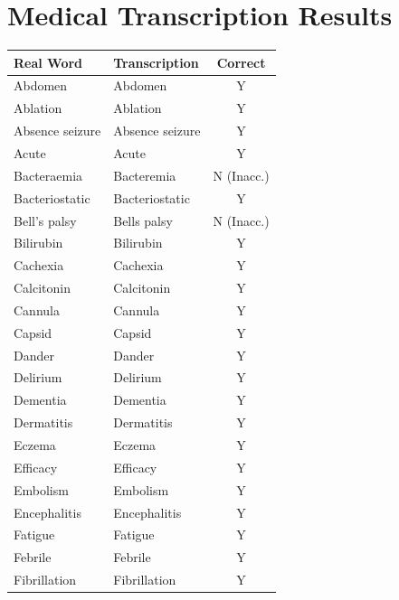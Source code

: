 \chapter{Medical Transcription Results}
\label{app:testing_transcription_results}

\begin{table}[H] %
\centering
\footnotesize %
\renewcommand{\arraystretch}{0.8} %

\begin{minipage}[t]{0.48\textwidth}
\centering
\begin{tabular}{|l|l|c|}
\hline
\textbf{Real Word} & \textbf{Transcription} & \textbf{Correct} \\ \hline
Abdomen & Abdomen & Y \\ \hline
Ablation & Ablation & Y \\ \hline
Absence seizure & Absence seizure & Y \\ \hline
Acute & Acute & Y \\ \hline
Bacteraemia & Bacteremia & N (Inacc.) \\ \hline
Bacteriostatic & Bacteriostatic & Y \\ \hline
Bell's palsy & Bells palsy & N (Inacc.) \\ \hline
Bilirubin & Bilirubin & Y \\ \hline
Cachexia & Cachexia & Y \\ \hline
Calcitonin & Calcitonin & Y \\ \hline
Cannula & Cannula & Y \\ \hline
Capsid & Capsid & Y \\ \hline
Dander & Dander & Y \\ \hline
Delirium & Delirium & Y \\ \hline
Dementia & Dementia & Y \\ \hline
Dermatitis & Dermatitis & Y \\ \hline
Eczema & Eczema & Y \\ \hline
Efficacy & Efficacy & Y \\ \hline
Embolism & Embolism & Y \\ \hline
Encephalitis & Encephalitis & Y \\ \hline
Fatigue & Fatigue & Y \\ \hline
Febrile & Febrile & Y \\ \hline
Fibrillation & Fibrillation & Y \\ \hline

\end{tabular}
\end{minipage}
\end{table}
